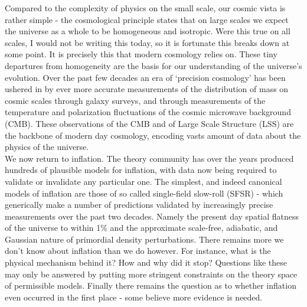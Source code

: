\documentclass[a4paper,10pt]{article}
\begin{document}
Compared to the complexity of physics on the small scale, our cosmic vista is rather simple - the cosmological principle states that on large scales we expect the universe as a whole to be homogeneous and isotropic. Were this true on all scales, I would not be writing this today, so it is fortunate this breaks down at some point. It is precisely this that modern cosmology relies on. These tiny departures from homogeneity are the basis for our understanding of the universe's evolution. Over the past few decades an era of `precision cosmology' has been ushered in by ever more accurate measurements of the distribution of mass on cosmic scales through galaxy surveys, and through measurements of the temperature and polarization fluctuations of the cosmic microwave background (CMB). These observations of the CMB and of Large Scale Structure (LSS) are the backbone of modern day cosmology, encoding vasts amount of data about the physics of the universe.\\

We now return to inflation. The theory community has over the years produced hundreds of plausible models for inflation, with data now being required to validate or invalidate any particular one. The simplest, and indeed canonical models of inflation are those of so called single-field slow-roll (SFSR) - which generically make a number of predictions validated by increasingly precise measurements over the past two decades. Namely the present day spatial flatness of the universe to within 1\% and the approximate scale-free, adiabatic, and Gaussian nature of primordial density perturbations. There remains more we don't know about inflation than we do however. For instance, what is the physical mechanism behind it? How and why did it stop? Questions like these may only be answered by putting more stringent constraints on the theory space of permissible models. Finally there remains the question as to whether inflation even occurred in the first place - some believe more evidence is needed.\\
\end{document}
